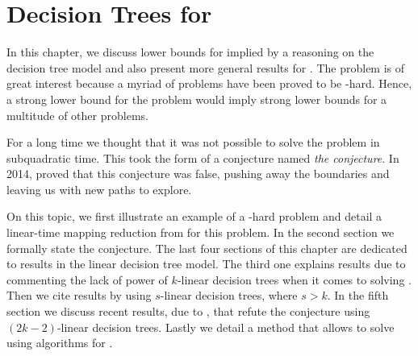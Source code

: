 \chapter{Decision Trees for \threeSUM}
\label{tree:3sum}

In this chapter, we discuss lower bounds for \threeSUM implied by a
reasoning on the decision tree model and also present more
general results for \kLDT. The \threeSUM problem is of great
interest because a myriad of problems
have been proved to be \threeSUM-hard. Hence, a strong lower bound for
the \threeSUM problem would imply strong lower bounds for a multitude of other
problems.

For a long time we thought that it was not possible to solve the \threeSUM
problem in subquadratic time. This took the form of a
conjecture named \emph{the \threeSUM conjecture}. In 2014, \citet*{gronlund:2014}
proved that this conjecture was false, pushing away the
boundaries and leaving us with new paths to explore.

On this topic, we first illustrate an example of a \threeSUM-hard problem
and detail a linear-time mapping reduction from \threeSUM for this problem. In
the second section we formally state the \threeSUM conjecture. The last
four sections of this chapter are dedicated to results in the linear
decision tree model. The third one explains results due to
\citet*{erickson:1999} commenting the lack of power of $k$-linear decision
trees when it comes to solving \ksum. Then we cite results by
\citet*{ailon:2005} using $s$-linear decision trees, where \(s > k\). In the fifth section
we discuss recent results, due to \citet*{gronlund:2014}, that refute
the \threeSUM conjecture using $(2k-2)$-linear decision trees. Lastly we
detail a method that allows to solve \kLDT using algorithms for \threeSUM.
